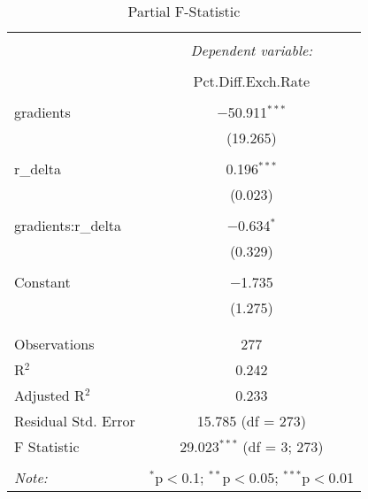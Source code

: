 
\begin{table}[!htbp] \centering 
  \caption{Partial F-Statistic} 
  \label{tab:partial} 
\begin{tabular}{@{\extracolsep{5pt}}lc} 
\\[-1.8ex]\hline 
\hline \\[-1.8ex] 
 & \multicolumn{1}{c}{\textit{Dependent variable:}} \\ 
\cline{2-2} 
\\[-1.8ex] & Pct.Diff.Exch.Rate \\ 
\hline \\[-1.8ex] 
 gradients & $-$50.911$^{***}$ \\ 
  & (19.265) \\ 
  & \\ 
 r\_delta & 0.196$^{***}$ \\ 
  & (0.023) \\ 
  & \\ 
 gradients:r\_delta & $-$0.634$^{*}$ \\ 
  & (0.329) \\ 
  & \\ 
 Constant & $-$1.735 \\ 
  & (1.275) \\ 
  & \\ 
\hline \\[-1.8ex] 
Observations & 277 \\ 
R$^{2}$ & 0.242 \\ 
Adjusted R$^{2}$ & 0.233 \\ 
Residual Std. Error & 15.785 (df = 273) \\ 
F Statistic & 29.023$^{***}$ (df = 3; 273) \\ 
\hline 
\hline \\[-1.8ex] 
\textit{Note:}  & \multicolumn{1}{r}{$^{*}$p$<$0.1; $^{**}$p$<$0.05; $^{***}$p$<$0.01} \\ 
\end{tabular} 
\end{table} 
